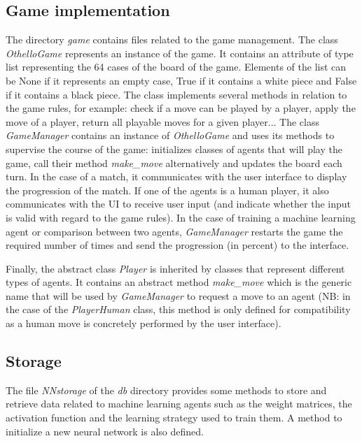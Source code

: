\documentclass{article}
\begin{document}
\subsection{Game implementation}

The directory \textit{game} contains files related to the game management. The class \textit{OthelloGame} represents an instance of the game. It contains an attribute of type list representing the 64 cases of the board of the game. Elements of the list can be None if it represents an empty case, True if it contains a white piece and False if it contains a black piece. The class implements several methods in relation to the game rules, for example: check if a move can be played by a player, apply the move of a player, return all playable moves for a given player... The class \textit{GameManager} contains an instance of \textit{OthelloGame} and uses its methods to supervise the course of the game: initializes classes of agents that will play the game, call their method \textit{make\_move} alternatively and updates the board each turn. In the case of a match, it communicates with the user interface to display the progression of the match. If one of the agents is a human player, it also communicates with the UI to receive user input (and indicate whether the input is valid with regard to the game rules). In the case of training a machine learning agent or comparison between two agents, \textit{GameManager} restarts the game the required number of times and send the progression (in percent) to the interface.

Finally, the abstract class \textit{Player} is inherited by classes that represent different types of agents. It contains an abstract method \textit{make\_move} which is the generic name that will be used by \textit{GameManager} to request a move to an agent (NB: in the case of the \textit{PlayerHuman} class, this method is only defined for compatibility as a human move is concretely performed by the user interface).

\subsection{Storage}

The file \textit{NNstorage} of the \textit{db} directory provides some methods to store and retrieve data related to machine learning agents such as the weight matrices, the activation function and the learning strategy used to train them. A method to initialize a new neural network is also defined.
\end{document}
